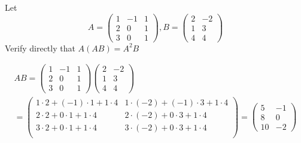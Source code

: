 \documentclass[a4paper, 10pt]{article}
\begin{document}
\begin{problem} 
Let
\[
    A = \begin{pmatrix}
            1 & -1 & 1 \\
            2 & 0  & 1 \\
            3 & 0  & 1
        \end{pmatrix},
    B = \begin{pmatrix}
            2 & -2 \\
            1 & 3  \\
            4 & 4
        \end{pmatrix}
\]
Verify directly that \(A(AB) = A^2B\)
\end{problem}
\begin{solution}

    \begin{multline*}
        AB = \begin{pmatrix}
                1 & -1 & 1 \\
                2 & 0  & 1 \\
                3 & 0  & 1
            \end{pmatrix}\begin{pmatrix}
                2 & -2 \\
                1 & 3  \\
                4 & 4
            \end{pmatrix}
        \\
        = \begin{pmatrix}
                1 \cdot 2 + (-1) \cdot 1 + 1 \cdot 4 & 1 \cdot (-2) + (-1) \cdot 3 + 1 \cdot 4 \\
                2 \cdot 2 + 0 \cdot 1 + 1 \cdot 4    & 2 \cdot (-2) + 0 \cdot 3 + 1 \cdot 4    \\
                3 \cdot 2 + 0 \cdot 1 + 1 \cdot 4    & 3 \cdot (-2) + 0 \cdot 3 + 1 \cdot 4    \\
            \end{pmatrix}
        = \begin{pmatrix}
                5  & -1 \\
                8  & 0  \\
                10 & -2
            \end{pmatrix}
    \end{multline*}


\end{solution}
\end{document}
